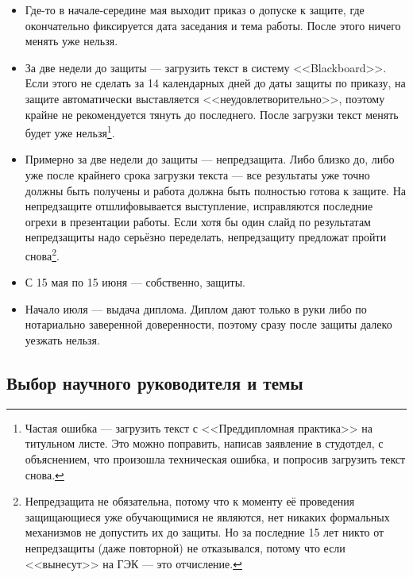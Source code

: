 \documentclass{article}
\begin{document}
\begin{itemize}
    \item Где-то в начале-середине мая выходит приказ о допуске к защите, где окончательно фиксируется дата заседания и тема работы. После этого ничего менять уже нельзя.
    \item За две недели до защиты --- загрузить текст в систему <<Blackboard>>. Если этого не сделать за 14 календарных дней до даты защиты по приказу, на защите автоматически выставляется <<неудовлетворительно>>, поэтому крайне не рекомендуется тянуть до последнего. После загрузки текст менять будет уже нельзя\footnote{Частая ошибка --- загрузить текст с <<Преддипломная практика>> на титульном листе. Это можно поправить, написав заявление в студотдел, с объяснением, что произошла техническая ошибка, и попросив загрузить текст снова.}.
    \item Примерно за две недели до защиты --- непредзащита. Либо близко до, либо уже после крайнего срока загрузки текста --- все результаты уже точно должны быть получены и работа должна быть полностью готова к защите. На непредзащите отшлифовывается выступление, исправляются последние огрехи в презентации работы. Если хотя бы один слайд по результатам непредзащиты надо серьёзно переделать, непредзащиту предложат пройти снова\footnote{Непредзащита не обязательна, потому что к моменту её проведения защищающиеся уже обучающимися не являются, нет никаких формальных механизмов не допустить их до защиты. Но за последние 15 лет никто от непредзащиты (даже повторной) не отказывался, потому что если <<вынесут>> на ГЭК --- это отчисление.}.
    \item С 15 мая по 15 июня --- собственно, защиты.
    \item Начало июля --- выдача диплома. Диплом дают только в руки либо по нотариально заверенной доверенности, поэтому сразу после защиты далеко уезжать нельзя.
\end{itemize}

\subsection{Выбор научного руководителя и темы}
\end{document}
